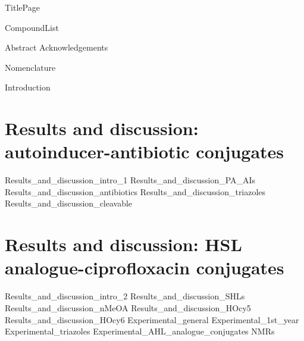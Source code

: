 \documentclass[10pt,a4paper]{article}
\begin{document}
{TitlePage}

{CompoundList}

\tableofcontents

{Abstract}
{Acknowledgements}

\newpage
{Nomenclature}
\printnomenclature

\newpage
{Introduction}
\newpage
\section{Results and discussion: autoinducer-antibiotic conjugates\label{sec:AACs}}
{Results_and_discussion_intro_1}
{Results_and_discussion_PA_AIs}
{Results_and_discussion_antibiotics}
{Results_and_discussion_triazoles}
{Results_and_discussion_cleavable}
\section{Results and discussion: HSL analogue-ciprofloxacin conjugates\label{sec:HSLCipCs}}
{Results_and_discussion_intro_2}
{Results_and_discussion_SHLs}
{Results_and_discussion_nMeOA}
{Results_and_discussion_HOcy5}
{Results_and_discussion_HOcy6}
\newpage
{Experimental_general}
{Experimental_1st_year}
{Experimental_triazoles}
{Experimental_AHL_analogue_conjugates}
{NMRs}

\newpage
{}


\listoftodos
\end{document}
